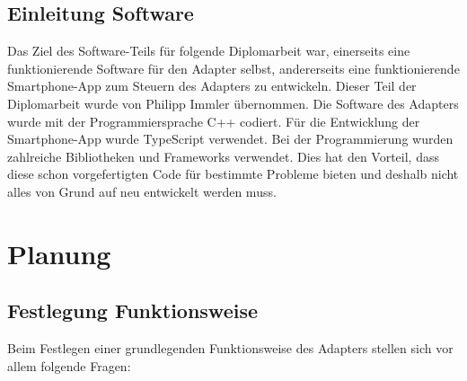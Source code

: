 \documentclass[11pt, twoside]{article}
\begin{document}
\subsection{Einleitung Software}
Das Ziel des Software-Teils für folgende Diplomarbeit war, einerseits eine funktionierende Software für den Adapter selbst, andererseits eine funktionierende Smartphone-App zum Steuern des Adapters zu entwickeln. Dieser Teil der Diplomarbeit wurde von Philipp Immler übernommen. Die Software des Adapters wurde mit der Programmiersprache C++ codiert. Für die Entwicklung der Smartphone-App wurde TypeScript verwendet. Bei der Programmierung wurden zahlreiche Bibliotheken und Frameworks verwendet. Dies hat den Vorteil, dass diese schon vorgefertigten Code für bestimmte Probleme bieten und deshalb nicht alles von Grund auf neu entwickelt werden muss.
\section{Planung}
\subsection{Festlegung Funktionsweise}
Beim Festlegen einer grundlegenden Funktionsweise des Adapters stellen sich vor allem folgende Fragen:
\end{document}
